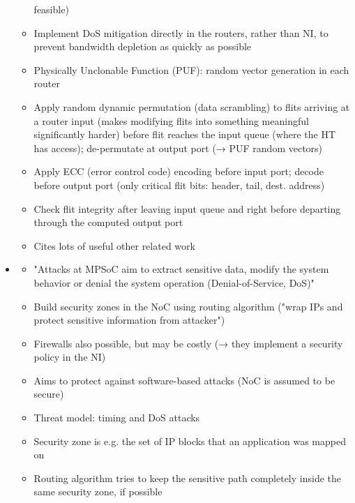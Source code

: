 \documentclass[
	paper=a4,
	fontsize=11pt,
	parskip=full %
]{scrreprt}
\begin{document}
\begin{itemize}
\begin{itemize}
                    feasible)
                \item Implement DoS mitigation directly in the routers, rather than NI, to prevent bandwidth depletion as quickly as possible
                \item Physically Unclonable Function (PUF): random vector generation in each router
                \item Apply random dynamic permutation (data scrambling) to flits arriving at a router input (makes modifying flits into something
                    meaningful significantly harder) before flit reaches the input queue (where the HT has access); de-permutate at output port (→
                    PUF random vectors)
                \item Apply ECC (error control code) encoding before input port; decode before output port (only critical flit bits: header, tail,
                    dest. address)
                \item Check flit integrity after leaving input queue and right before departing through the computed output port
                \item Cites lots of useful other related work
            \end{itemize}
        \item \textbf{}
            \begin{itemize}
                \item "Attacks at MPSoC aim to extract sensitive data, modify the system behavior or denial the system operation (Denial-of-Service,
                    DoS)"
                \item Build security zones in the NoC using routing algorithm ("wrap IPs and protect sensitive information from attacker")
                \item Firewalls also possible, but may be costly (→ they implement a security policy in the NI)
                \item Aims to protect against software-based attacks (NoC is assumed to be secure)
                \item Threat model: timing and DoS attacks
                \item Security zone is e.g. the set of IP blocks that an application was mapped on
                \item Routing algorithm tries to keep the sensitive path completely inside the same security zone, if possible
            \end{itemize}

\end{itemize}
\end{document}
